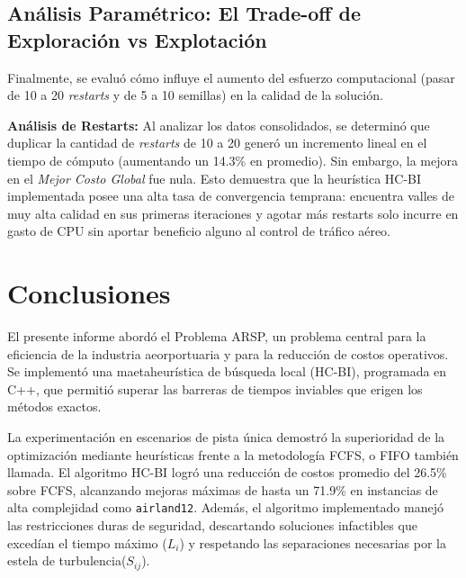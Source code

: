\documentclass[letter, 10pt]{article}
\begin{document}
\subsection{Análisis Paramétrico: El Trade-off de Exploración vs Explotación}
Finalmente, se evaluó cómo influye el aumento del esfuerzo computacional (pasar de 10 a 20 \textit{restarts} y de 5 a 10 semillas) en la calidad de la solución.

\textbf{Análisis de Restarts:} Al analizar los datos consolidados, se determinó que duplicar la cantidad de \textit{restarts} de 10 a 20 generó un incremento lineal en el tiempo de cómputo (aumentando un 14.3\% en promedio). Sin embargo, la mejora en el \textit{Mejor Costo Global} fue nula. Esto demuestra que la heurística HC-BI implementada posee una alta tasa de convergencia temprana: encuentra valles de muy alta calidad en sus primeras iteraciones y agotar más restarts solo incurre en gasto de CPU sin aportar beneficio alguno al control de tráfico aéreo.

\section{Conclusiones}
El presente informe abordó el Problema ARSP, un problema central para la eficiencia de la industria aeorportuaria y para la reducción de costos operativos. Se implementó una maetaheurística de búsqueda local (HC-BI), programada en C++, que permitió superar las barreras de tiempos inviables que erigen los métodos exactos.

La experimentación en escenarios de pista única demostró la superioridad de la optimización mediante heurísticas frente a la metodología FCFS, o FIFO también llamada. El algoritmo HC-BI logró una reducción de costos promedio del 26.5\% sobre FCFS, alcanzando mejoras máximas de hasta un 71.9\% en instancias de alta complejidad como \texttt{airland12}.
Además, el algoritmo implementado manejó las restricciones duras de seguridad, descartando soluciones infactibles que excedían el tiempo máximo ($L_i$) y respetando las separaciones necesarias por la estela de turbulencia($S_{ij}$).
\end{document}
